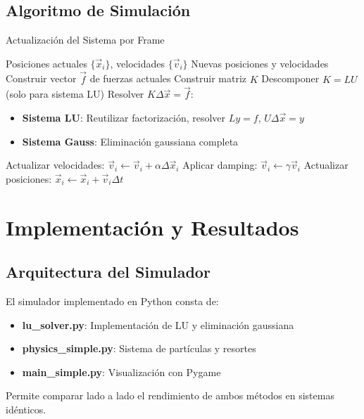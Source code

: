 \documentclass[12pt,a4paper]{article}
\begin{document}
\subsection{Algoritmo de Simulación}

\begin{algorithm}[H]
\caption{Actualización del Sistema por Frame}
\begin{algorithmic}[1]
\REQUIRE Posiciones actuales \(\{\vec{x}_i\}\), velocidades \(\{\vec{v}_i\}\)
\ENSURE Nuevas posiciones y velocidades
\STATE Construir vector \(\vec{f}\) de fuerzas actuales
    \STATE Construir matriz \(K\)
    \STATE Descomponer \(K = LU\) (solo para sistema LU)
\ENDIF
\STATE Resolver \(K\Delta\vec{x} = \vec{f}\):
\begin{itemize}
    \item \textbf{Sistema LU}: Reutilizar factorización, resolver \(Ly = f\), \(U\Delta\vec{x} = y\)
    \item \textbf{Sistema Gauss}: Eliminación gaussiana completa
\end{itemize}
\STATE Actualizar velocidades: \(\vec{v}_i \leftarrow \vec{v}_i + \alpha \Delta\vec{x}_i\)
\STATE Aplicar damping: \(\vec{v}_i \leftarrow \gamma \vec{v}_i\)
\STATE Actualizar posiciones: \(\vec{x}_i \leftarrow \vec{x}_i + \vec{v}_i \Delta t\)
\end{algorithmic}
\end{algorithm}

\section{Implementación y Resultados}

\subsection{Arquitectura del Simulador}

El simulador implementado en Python consta de:
\begin{itemize}
\item \textbf{lu\_solver.py}: Implementación de LU y eliminación gaussiana
\item \textbf{physics\_simple.py}: Sistema de partículas y resortes
\item \textbf{main\_simple.py}: Visualización con Pygame
\end{itemize}

Permite comparar lado a lado el rendimiento de ambos métodos en sistemas idénticos.
\end{document}
